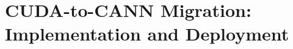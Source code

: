 
\chapter{CUDA-to-CANN Migration: Implementation and Deployment}
\label{chap:migration-implementation}






